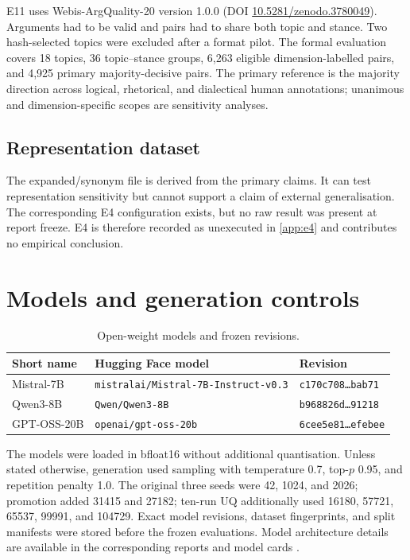 \documentclass[11pt,twoside,a4paper]{report}
\begin{document}
E11 uses Webis-ArgQuality-20 version 1.0.0 (DOI
\href{https://doi.org/10.5281/zenodo.3780049}{10.5281/zenodo.3780049}).  Arguments had
to be valid and pairs had to share both topic and stance.  Two hash-selected topics
were excluded after a format pilot.  The formal evaluation covers 18 topics, 36
topic--stance groups, 6,263 eligible dimension-labelled pairs, and 4,925 primary
majority-decisive pairs.  The primary reference is the majority direction across
logical, rhetorical, and dialectical human annotations; unanimous and
dimension-specific scopes are sensitivity analyses.

\subsection{Representation dataset}

The expanded/synonym file is derived from the primary claims.  It can test
representation sensitivity but cannot support a claim of external generalisation.
The corresponding E4 configuration exists, but no raw result was present at report
freeze.  E4 is therefore recorded as unexecuted in \cref{app:e4} and contributes no
empirical conclusion.

\section{Models and generation controls}

\begin{table}[htbp]
\centering
\caption{Open-weight models and frozen revisions.}
\label{tab:models}
\begin{tabularx}{\textwidth}{lYY}
\toprule
Short name & Hugging Face model & Revision \\
\midrule
Mistral-7B & \texttt{mistralai/Mistral-7B-Instruct-v0.3} & \texttt{c170c708\ldots bab71} \\
Qwen3-8B & \texttt{Qwen/Qwen3-8B} & \texttt{b968826d\ldots 91218} \\
GPT-OSS-20B & \texttt{openai/gpt-oss-20b} & \texttt{6cee5e81\ldots efebee} \\
\bottomrule
\end{tabularx}
\end{table}

The models were loaded in bfloat16 without additional quantisation.  Unless stated
otherwise, generation used sampling with temperature 0.7, top-$p$ 0.95, and
repetition penalty 1.0.  The original three seeds were 42, 1024, and 2026; promotion
added 31415 and 27182; ten-run UQ additionally used 16180, 57721, 65537, 99991, and
104729.  Exact model revisions, dataset fingerprints, and split manifests were
stored before the frozen evaluations.  Model architecture details are available in
the corresponding reports and model cards \cite{jiang2023mistral,yang2025qwen3,openai2025gptoss}.
\end{document}
